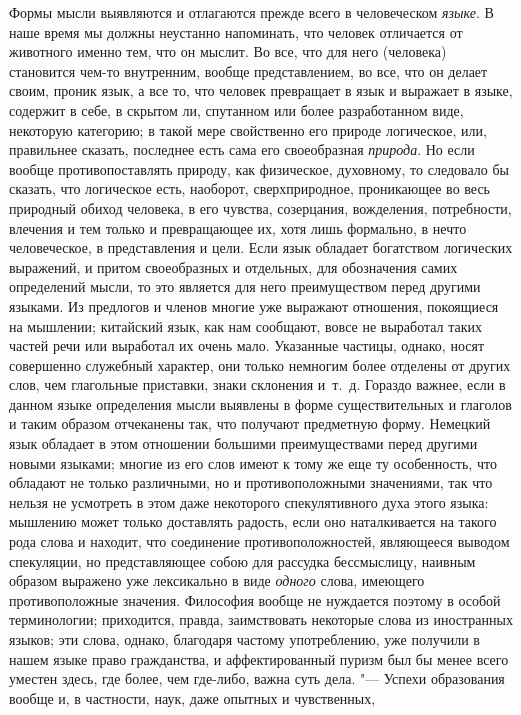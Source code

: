 Формы мысли выявляются и отлагаются прежде всего в человеческом
{\em языке}. В наше время мы должны неустанно
напоминать, что человек отличается от животного именно тем, что он мыслит.
Во все, что для него (человека) становится чем-то внутренним, вообще
представлением, во все, что он делает своим, проник язык, а все то, что
человек превращает в язык и выражает в языке, содержит в себе, в скрытом
ли, спутанном или более разработанном виде, некоторую категорию; в такой
мере свойственно его природе логическое, или, правильнее сказать, последнее
есть сама его своеобразная {\em природа}. Но если
вообще противопоставлять природу, как физическое, духовному, то следовало
бы сказать, что логическое есть, наоборот, сверхприродное, проникающее во
весь природный обиход человека, в его чувства, созерцания, вожделения,
потребности, влечения и тем только и превращающее их, хотя лишь формально,
в нечто человеческое, в представления и цели. Если язык обладает богатством
логических выражений, и притом своеобразных и отдельных, для обозначения
самих определений мысли, то это является для него преимуществом перед
другими языками. Из предлогов и членов многие уже выражают отношения,
покоящиеся на мышлении; китайский язык, как нам сообщают, вовсе не
выработал таких частей речи или выработал их очень мало. Указанные частицы,
однако, носят совершенно служебный характер, они только немногим более
отделены от других слов, чем глагольные приставки, знаки склонения и~т.~д.
Гораздо важнее, если в данном языке определения мысли выявлены в форме
существительных и глаголов и таким образом отчеканены так, что получают
предметную форму. Немецкий язык обладает в этом отношении большими
преимуществами перед другими новыми языками; многие из его слов имеют к
тому же еще ту особенность, что обладают не только различными, но и
противоположными значениями, так что нельзя не усмотреть в этом даже
некоторого спекулятивного духа этого языка: мышлению может только
доставлять радость, если оно наталкивается на такого рода слова и находит,
что соединение противоположностей, являющееся выводом спекуляции, но
представляющее собою для рассудка бессмыслицу, наивным образом выражено уже
лексикально в виде {\em одного} слова, имеющего
противоположные значения. Философия вообще не нуждается поэтому в особой
терминологии; приходится, правда, заимствовать некоторые слова из
иностранных языков; эти слова, однако, благодаря частому употреблению, уже
получили в нашем языке право гражданства, и аффектированный пуризм был бы
менее всего уместен здесь, где более, чем где-либо, важна суть дела. "---
Успехи образования вообще и, в частности, наук, даже опытных и чувственных,
